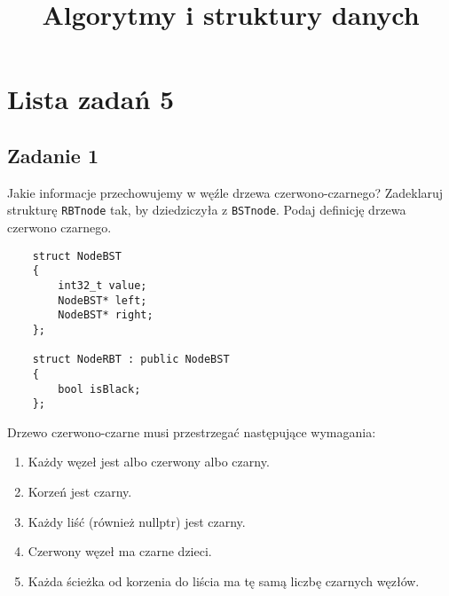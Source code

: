 \documentclass{article}
\begin{document}
\title{Algorytmy i struktury danych}
\author{}
\date{}
\maketitle

\section*{Lista zadań 5}

\subsection*{Zadanie 1}
Jakie informacje przechowujemy w węźle drzewa czerwono-czarnego?
Zadeklaruj strukturę \verb+RBTnode+ tak, by dziedziczyła z \verb+BSTnode+. Podaj definicję drzewa czerwono czarnego.
\begin{lstlisting}
    struct NodeBST
    {
        int32_t value;
        NodeBST* left;
        NodeBST* right;  
    };

    struct NodeRBT : public NodeBST
    {
        bool isBlack;
    };
\end{lstlisting}
Drzewo czerwono-czarne musi przestrzegać następujące wymagania:
\begin{enumerate}
    \item Każdy węzeł jest albo czerwony albo czarny.
    \item Korzeń jest czarny.
    \item Każdy liść (również nullptr) jest czarny.
    \item Czerwony węzeł ma czarne dzieci.
    \item Każda ścieżka od korzenia do liścia ma tę samą liczbę czarnych węzłów.
\end{enumerate}
\end{document}

